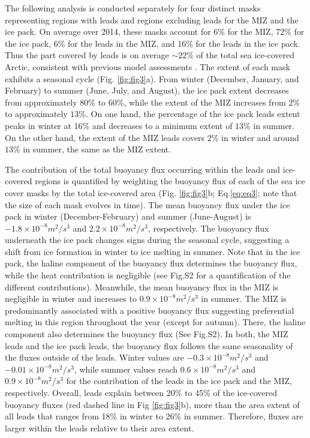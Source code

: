\documentclass[draft]{agujournal2019}
\begin{document}
The following analysis is conducted separately for four distinct masks representing regions with leads and regions excluding leads for the MIZ and the ice pack. On average over 2014, these masks account for 6\% for the MIZ, 72\% for the ice pack, 6\% for the leads in the MIZ, and 16\% for the leads in the ice pack. Thus the part covered by leads is on average $\sim 22\%$ of the total sea ice-covered Arctic, consistent with previous model assessments \cite{Wang_leads_2016}. 
The extent of each mask exhibits a seasonal cycle (Fig. \ref{fig:fig3}a). From winter (December, January, and February) to  summer (June, July, and August), the ice pack extent decreases from approximately $80\%$ to $60\%$, while the extent of the MIZ increases from $2\%$ to approximately $13\%$. 
On one hand, the percentage of the ice pack leads extent peaks in winter at 16\% and decreases to a minimum extent of $13\%$ in summer. On the other hand, the extent of the MIZ leads covers $2\%$ in winter and around $13\%$ in summer, the same as the MIZ extent. 

The contribution of the total buoyancy flux occurring within the leads and ice-covered regions is quantified by weighting the buoyancy flux of each of the sea ice cover masks by the total ice-covered area (Fig. \ref{fig:fig3}b; Eq.\ref{eq:eq3}; note that the size of each mask evolves in time). The mean buoyancy flux under the ice pack in winter (December-February) and summer (June-August) is $-1.8 \times10^{-8} m^2/s^3$  and $2.2 \times10^{-8} m^2/s^3$, respectively. The buoyancy flux underneath the ice pack changes signs during the seasonal cycle, suggesting a shift from ice formation in winter to ice melting in summer. Note that in the ice pack, the haline component of the buoyancy flux determines the buoyancy flux, while the heat contribution is negligible (see Fig.S2 for a quantification of the different contributions). Meanwhile, the mean buoyancy flux in the MIZ is negligible in winter and increases to $0.9 \times10^{-8}m^2/s^3$ in summer. The MIZ is predominantly associated with a positive buoyancy flux suggesting preferential melting in this region throughout the year (except for autumn). There, the haline component also determines the buoyancy flux (See Fig.S2). In both, the MIZ leads and the ice pack leads, the buoyancy flux follows the same seasonality of the fluxes outside of the leads. Winter values are $-0.3 \times10^{-8}m^2/s^3$ and $-0.01 \times10^{-8}m^2/s^3$, while summer values reach $0.6 \times10^{-8}m^2/s^3$ and $0.9 \times10^{-8}m^2/s^3$ for the contribution of the leads in the ice pack and the MIZ, respectively.
Overall, leads explain between 20\% to 45\% of the ice-covered buoyancy fluxes (red dashed line in Fig \ref{fig:fig3}b), more than the area extent of all leads that ranges from 18\% in winter to 26\% in summer. Therefore, fluxes are larger within the leads relative to their area extent. 
\end{document}

